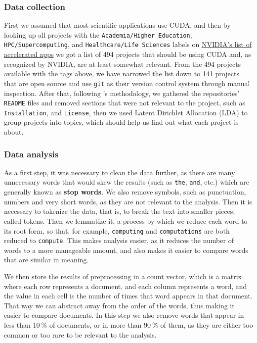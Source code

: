 \documentclass[11pt, conference, onecolumn, final]{IEEEtran}
\begin{document}
\subsubsection{Data collection} \label{sec:methodology:statistics-data}

First we assumed that most scientific applications use CUDA, and then by
looking up all projects with the \verb|Academia/Higher Education|,
\verb|HPC/Supercomputing|, and \verb|Healthcare/Life Sciences| labels on
\href{https://nvidia.com/en-us/gpu-accelerated-applications}{NVIDIA's list of accelerated apps}
we got a list of 494 projects that should be using CUDA and, as recognized by
NVIDIA, are at least somewhat relevant.
From the 494 projects available with the tags above, we have narrowed the list
down to 141 projects that are open source and use \verb|git| as their version
control system through manual inspection.
After that, following \cite{zheng2018measuring}'s methodology, we gathered the
repositories' \verb|README| files and removed sections that were not relevant to
the project, such as \verb|Installation|, and \verb|License|, then we used
Latent Dirichlet Allocation (LDA) to group projects into topics, which should
help us find out what each project is about.

\subsubsection{Data analysis} \label{sec:methodology:statistics-analysis}

As a first step, it was necessary to clean the data further, as there are many
unnecessary words that would skew the results (such as \verb|the|, \verb|and|,
etc.) which are generally known as \textbf{stop words}.
We also remove symbols, such as punctuation, numbers and very short words, as
they are not relevant to the analysis.
Then it is necessary to tokenize the data, that is, to break the text into
smaller pieces, called tokens.
Then we lemmatize it, a process by which we reduce each word to its root form,
so that, for example, \verb|computing| and \verb|computations| are both reduced
to \verb|compute|.
This makes analysis easier, as it reduces the number of words to a more
manageable amount, and also makes it easier to compare words that are similar
in meaning.

We then store the results of preprocessing in a count vector, which is a matrix
where each row represents a document, and each column represents a word, and
the value in each cell is the number of times that word appears in that
document.
That way we can abstract away from the order of the words, thus making it
easier to compare documents.
In this step we also remove words that appear in less than $\qty{10}{\percent}$
of documents, or in more than $\qty{90}{\percent}$ of them, as they are either
too common or too rare to be relevant to the analysis.
\end{document}
